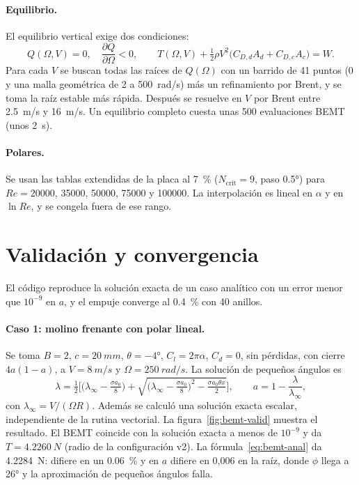 \paragraph{Equilibrio.} El equilibrio vertical exige dos condiciones:
\begin{equation}
  Q(\Omega,V)=0,\quad \frac{\partial Q}{\partial\Omega}<0,\qquad
  T(\Omega,V)+\tfrac12\rho V^2\big(C_{D,d}A_d+C_{D,c}A_c\big)=W.
  \label{eq:bemt-eq}
\end{equation}
Para cada $V$ se buscan todas las raíces de $Q(\Omega)$ con un barrido de 41 puntos
(0 y una malla geométrica de 2 a \SI{500}{rad/s}) más un refinamiento por Brent, y se
toma la raíz estable más rápida. Después se resuelve en $V$ por Brent entre
\SI{2.5}{m/s} y \SI{16}{m/s}. Un equilibrio completo cuesta unas 500 evaluaciones BEMT
(unos \SI{2}{s}).

\paragraph{Polares.} Se usan las tablas extendidas de la placa al \SI{7}{\percent}
($N_\mathrm{crit}=9$, paso \ang{0.5}) para $Re=\num{20000}$, \num{35000}, \num{50000},
\num{75000} y \num{100000}. La interpolación es lineal en $\alpha$ y en $\ln Re$, y se
congela fuera de ese rango.

\section{Validación y convergencia}\label{sec:bemt-valid}

El código reproduce la solución exacta de un caso analítico con un error menor que
$10^{-9}$ en $a$, y el empuje converge al \SI{0.4}{\percent} con 40 anillos.

\paragraph{Caso 1: molino frenante con polar lineal.} Se toma $B=2$, $c=\SI{20}{mm}$,
$\theta=\ang{-4}$, $C_l=2\pi\alpha$, $C_d=0$, sin pérdidas, con cierre $4a(1-a)$, a
$V=\SI{8}{m/s}$ y $\Omega=\SI{250}{rad/s}$. La solución de pequeños ángulos es
\begin{equation}
  \lambda=\tfrac12\Big[\big(\lambda_\infty-\tfrac{\sigma a_0}{8}\big)
  +\sqrt{\big(\lambda_\infty-\tfrac{\sigma a_0}{8}\big)^2-\tfrac{\sigma a_0\theta x}{2}}\Big],
  \qquad a=1-\frac{\lambda}{\lambda_\infty},
  \label{eq:bemt-anal}
\end{equation}
con $\lambda_\infty=V/(\Omega R)$. Además se calculó una solución exacta escalar,
independiente de la rutina vectorial. La figura~\ref{fig:bemt-valid} muestra el
resultado. El BEMT coincide con la solución exacta a menos de $10^{-9}$ y da
$T=\SI{4.2260}{N}$ (radio de la configuración v2). La fórmula~\eqref{eq:bemt-anal} da
\SI{4.2284}{N}: difiere en un \SI{0.06}{\percent} y en $a$ difiere en 0,006 en la raíz, donde
$\phi$ llega a \ang{26} y la aproximación de pequeños ángulos falla.

